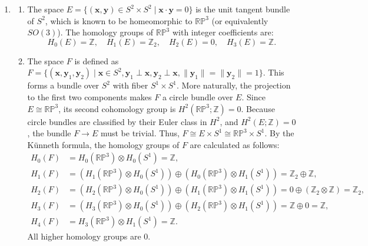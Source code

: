 \documentclass{article}
\begin{document}
\begin{enumerate}[label=\fbox{\arabic*}]
  \item %
        \begin{enumerate}[label=(\arabic*)]
          \item The space $E = \{ (\boldsymbol{x}, \boldsymbol{y}) \in S^2 \times S^2 \mid \boldsymbol{x} \cdot \boldsymbol{y} = 0 \}$ is the unit tangent bundle of $S^2$, which is known to be homeomorphic to $\mathbb{RP}^3$ (or equivalently $SO(3)$).
                The homology groups of $\mathbb{RP}^3$ with integer coefficients are:
                \[
                  H_0(E) = \mathbb{Z}, \quad H_1(E) = \mathbb{Z}_2, \quad H_2(E) = 0, \quad H_3(E) = \mathbb{Z}.
                \]
          \item The space $F$ is defined as $F = \{ (\boldsymbol{x}, \boldsymbol{y}_1, \boldsymbol{y}_2) \mid \boldsymbol{x} \in S^2, \boldsymbol{y}_1 \perp \boldsymbol{x}, \boldsymbol{y}_2 \perp \boldsymbol{x}, \|\boldsymbol{y}_1\| = \|\boldsymbol{y}_2\| = 1 \}$.
                This forms a bundle over $S^2$ with fiber $S^1 \times S^1$.
                More naturally, the projection to the first two components makes $F$ a circle bundle over $E$.
                Since $E \cong \mathbb{RP}^3$, its second cohomology group is $H^2(\mathbb{RP}^3; \mathbb{Z}) = 0$.
                Because circle bundles are classified by their Euler class in $H^2$, and $H^2(E; \mathbb{Z}) = 0$, the bundle $F \to E$ must be trivial.
                Thus, $F \cong E \times S^1 \cong \mathbb{RP}^3 \times S^1$.
                By the Künneth formula, the homology groups of $F$ are calculated as follows:
                \begin{align*}
                  H_0(F) & = H_0(\mathbb{RP}^3) \otimes H_0(S^1) = \mathbb{Z},                                                                                               \\
                  H_1(F) & = (H_1(\mathbb{RP}^3) \otimes H_0(S^1)) \oplus (H_0(\mathbb{RP}^3) \otimes H_1(S^1)) = \mathbb{Z}_2 \oplus \mathbb{Z},                            \\
                  H_2(F) & = (H_2(\mathbb{RP}^3) \otimes H_0(S^1)) \oplus (H_1(\mathbb{RP}^3) \otimes H_1(S^1)) = 0 \oplus (\mathbb{Z}_2 \otimes \mathbb{Z}) = \mathbb{Z}_2, \\
                  H_3(F) & = (H_3(\mathbb{RP}^3) \otimes H_0(S^1)) \oplus (H_2(\mathbb{RP}^3) \otimes H_1(S^1)) = \mathbb{Z} \oplus 0 = \mathbb{Z},                          \\
                  H_4(F) & = H_3(\mathbb{RP}^3) \otimes H_1(S^1) = \mathbb{Z}.
                \end{align*}
                All higher homology groups are 0.
        \end{enumerate}


\end{enumerate}
\end{document}
